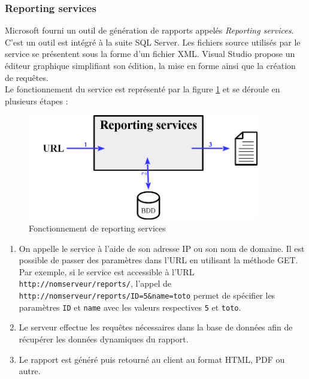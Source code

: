 
\subsubsection{Reporting services}

Microsoft fourni un outil de génération de rapports appelés \textit{Reporting services}.
C'est un outil est intégré à la suite SQL Server.
Les fichiers source utilisés par le service se présentent sous la forme d'un fichier XML.
Visual Studio propose un éditeur graphique simplifiant son édition, la mise en forme ainsi que la création de requêtes.
\\

Le fonctionnement du service est représenté par la figure \ref{reporting_services} et se déroule en plusieurs étapes :
\begin{figure}[!h]
	\center
	\includegraphics[width=0.9\textwidth]{img/reporting_services.png}
	\caption{Fonctionnement de reporting services}
	\label{reporting_services}
\end{figure}
\begin{enumerate}
	\item On appelle le service à l'aide de son adresse IP ou son nom de domaine.
Il est possible de passer des paramètres dans l'URL en utilisant la méthode GET.
Par exemple, si le service est accessible à l'URL \lstinline{http://nomserveur/reports/}, l'appel de \lstinline{http://nomserveur/reports/ID=5&name=toto} permet de spécifier les paramètres \lstinline{ID} et \lstinline{name} avec les valeurs respectives \lstinline{5} et \lstinline{toto}.
	\item Le serveur effectue les requêtes nécessaires dans la base de données afin de récupérer les données dynamiques du rapport.
	\item Le rapport est généré puis retourné au client au format HTML, PDF ou autre.
\end{enumerate}
~~\\


